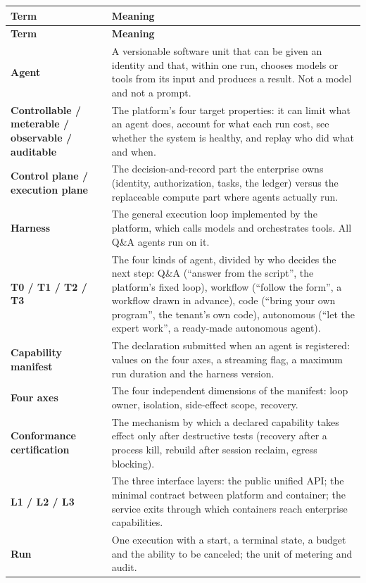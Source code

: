 \begin{longtable}{@{}>{\bfseries}L{3.9cm}L{\dimexpr\textwidth-3.9cm-2\tabcolsep\relax}@{}}
  \toprule
  \textbf{Term} & \textbf{Meaning}\\
  \midrule
  \endfirsthead
  \toprule
  \textbf{Term} & \textbf{Meaning}\\
  \midrule
  \endhead
  Agent & A versionable software unit that can be given an identity and that, within one run, chooses models or tools from its input and produces a result. Not a model and not a prompt.\\
  Controllable / meterable / observable / auditable & The platform's four target properties: it can limit what an agent does, account for what each run cost, see whether the system is healthy, and replay who did what and when.\\
  Control plane / execution plane & The decision-and-record part the enterprise owns (identity, authorization, tasks, the ledger) versus the replaceable compute part where agents actually run.\\
  Harness & The general execution loop implemented by the platform, which calls models and orchestrates tools. All Q\&A agents run on it.\\
  T0 / T1 / T2 / T3 & The four kinds of agent, divided by who decides the next step: Q\&A (``answer from the script'', the platform's fixed loop), workflow (``follow the form'', a workflow drawn in advance), code (``bring your own program'', the tenant's own code), autonomous (``let the expert work'', a ready-made autonomous agent).\\
  Capability manifest & The declaration submitted when an agent is registered: values on the four axes, a streaming flag, a maximum run duration and the harness version.\\
  Four axes & The four independent dimensions of the manifest: loop owner, isolation, side-effect scope, recovery.\\
  Conformance certification & The mechanism by which a declared capability takes effect only after destructive tests (recovery after a process kill, rebuild after session reclaim, egress blocking).\\
  L1 / L2 / L3 & The three interface layers: the public unified API; the minimal contract between platform and container; the service exits through which containers reach enterprise capabilities.\\
  Run & One execution with a start, a terminal state, a budget and the ability to be canceled; the unit of metering and audit.\\

\end{longtable}
